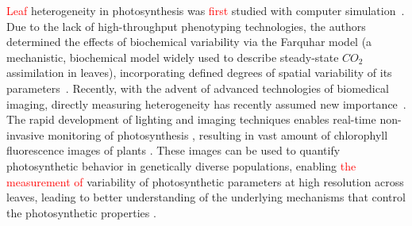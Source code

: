 \documentclass{bioinfo}
\begin{document}
\textcolor{red}{Leaf} heterogeneity in photosynthesis was \textcolor{red}{first} %
studied  with computer simulation~\citep{chen2008effect}. Due to the lack of high-throughput phenotyping technologies, the authors determined the effects of biochemical variability via the Farquhar model (a mechanistic, biochemical model widely used to describe steady-state $CO_2$ assimilation in leaves), incorporating defined degrees of spatial variability of its parameters~\citep{sharkey1985o2,farquhar2001models}. %
%
Recently, with the advent of advanced technologies of biomedical imaging, directly measuring heterogeneity has recently assumed new importance~\citep{tiihonen1996cerebral,wieneke1999non,wang2000,cruz2014depi}. The rapid development of lighting and imaging techniques enables real-time non-invasive monitoring of photosynthesis \citep{houle2010phenomics,cruz2014depi}, resulting in vast amount of chlorophyll fluorescence images of plants \citep{wituszynska2013multivariable}. These images can be used to quantify photosynthetic behavior in genetically diverse populations, enabling \textcolor{red}{the measurement of} %
variability of photosynthetic parameters at high resolution across leaves, leading to better understanding of the underlying mechanisms that control the photosynthetic properties \citep{rascher2011non,fiorani2013future}. %
\end{document}
